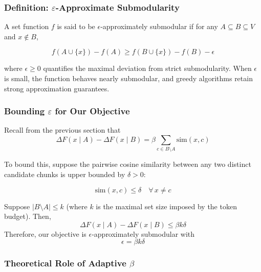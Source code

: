 \documentclass[11pt]{article}
\begin{document}
\subsubsection{Definition: $\varepsilon$-Approximate Submodularity}

A set function $f$ is said to be $\epsilon$-approximately submodular if for any $A \subseteq B \subseteq V$ and $x \notin B$,

\begin{equation}
  \label{eq:example}
  f(A \cup \{x\}) - f(A) \geq f(B \cup \{x\}) - f(B) - \epsilon
\end{equation}

where $\epsilon \geq 0$ quantifies the maximal deviation from strict submodularity. When $\epsilon$ is small, the function behaves nearly submodular, and greedy algorithms retain strong approximation guarantees.

\subsubsection{Bounding $\varepsilon$ for Our Objective}

Recall from the previous section that
\begin{equation}
  \label{eq:example}
  \Delta F(x \mid A) - \Delta F(x \mid B) = \beta \sum_{c \in B \setminus A} \mathrm{sim}(x, c)
\end{equation}

To bound this, suppose the pairwise cosine similarity between any two distinct candidate chunks is upper bounded by $\delta > 0$:

\begin{equation}
  \label{eq:example}
  \mathrm{sim}(x, c) \leq \delta \quad \forall\, x \neq c
\end{equation}

Suppose $|B \setminus A| \leq k$ (where $k$ is the maximal set size imposed by the token budget). Then,
\begin{equation}
  \label{eq:example}
  \Delta F(x \mid A) - \Delta F(x \mid B) \leq \beta k \delta
\end{equation}
Therefore, our objective is $\epsilon$-approximately submodular with
\begin{equation}
  \label{eq:example}
  \epsilon = \beta k \delta
\end{equation}

\subsubsection{Theoretical Role of Adaptive $\beta$}
\end{document}
